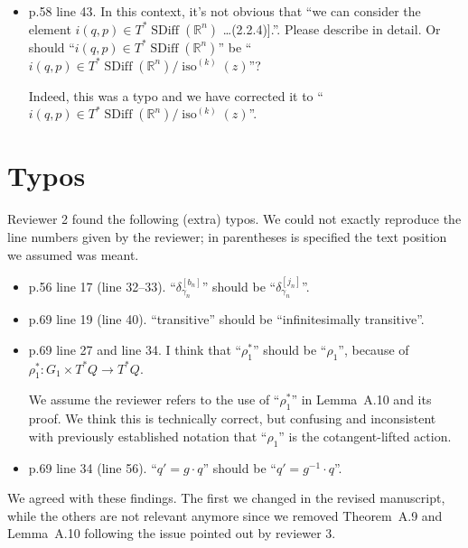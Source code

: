 \documentclass{article}
\def\R{\mathbb{R} }
\def\R{\mathbb{R} }
\DeclareMathOperator{\SDiff}{SDiff}
\DeclareMathOperator{\iso}{iso}
\begin{document}
\begin{itemize}
\item p.58 line 43. In this context, it's not obvious that ``we can
  consider the element $i(q, p) \in T^*\SDiff(\R^n)$ \ldots (2.2.4)].''.
  Please describe in detail. Or should ``$i(q,p) \in T^*\SDiff(\R^n)$''
  be ``$i(q,p) \in T^*\SDiff(\R^n) / \iso^{(k)}(z)$''?

  Indeed, this was a typo and we have corrected it to
  ``$i(q,p) \in T^*\SDiff(\R^n) / \iso^{(k)}(z)$''.
\end{itemize}

\clearpage
\section{Typos}
Reviewer 2 found the following (extra) typos. We could not exactly
reproduce the line numbers given by the reviewer; in parentheses is
specified the text position we assumed was meant.
\begin{itemize}
\item p.56 line 17 (line 32--33). ``$\delta_{\gamma_n}^{[b_n]}$'' should be ``$\delta_{\gamma_n}^{[j_n]}$''.
\item p.69 line 19 (line 40). ``transitive'' should be ``infinitesimally transitive''.
\item p.69 line 27 and line 34. I think that ``$\rho_1^*$'' should be
  ``$\rho_1$'', because of $\rho_1^*: G_1 \times T^*Q \to T^*Q$.

  We assume the reviewer refers to the use of ``$\rho_1^*$'' in
  Lemma~A.10 and its proof. We think this is technically correct, but
  confusing and inconsistent with previously established notation that
  ``$\rho_1$'' is the cotangent-lifted action.
\item p.69 line 34 (line 56). ``$q' = g \cdot q$'' should be ``$q' = g^{-1} \cdot q$''.
\end{itemize}

\noindent
We agreed with these findings. The first we changed in the revised
manuscript, while the others are not relevant anymore since we removed
Theorem~A.9 and Lemma~A.10 following the issue pointed out by reviewer 3.
\end{document}
